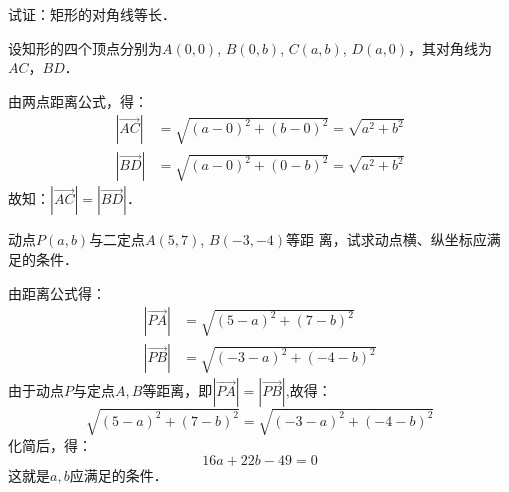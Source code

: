 \begin{example}
    试证：矩形的对角线等长．
\end{example}

\begin{solution}
设知形的四个顶点分别为$A(0,0)$, $B(0,b)$, $C(a,b)$, $D(a,0)$，其对角线为$AC$，$BD$．

由两点距离公式，得：
\[\begin{split}
    |\Vec{AC}|&=\sqrt{(a-0)^2+(b-0)^2}=\sqrt{a^2+b^2}\\
|\Vec{BD}|&=\sqrt{(a-0)^2+(0-b)^2}=\sqrt{a^2+b^2}
\end{split}\]
故知：$|\Vec{AC}|=|\Vec{BD}|$．
\end{solution}

\begin{example}
    动点$P(a,b)$与二定点$A(5,7)$, $B(-3,-4)$等距
离，试求动点横、纵坐标应满足的条件．
\end{example}


\begin{solution}
    由距离公式得：
\[\begin{split}
    |\Vec{PA}|&=\sqrt{(5-a)^2+(7-b)^2}\\
    |\Vec{PB}|&=\sqrt{(-3-a)^2+(-4-b)^2}
\end{split}\]
由于动点$P$与定点$A,B$等距离，即$|\Vec{PA}|=|\Vec{PB}|$,故得：
\[\sqrt{(5-a)^2+(7-b)^2}=\sqrt{(-3-a)^2+(-4-b)^2}\]
化简后，得：
\[16a+22b-49=0\]
这就是$a,b$应满足的条件．
\end{solution}

